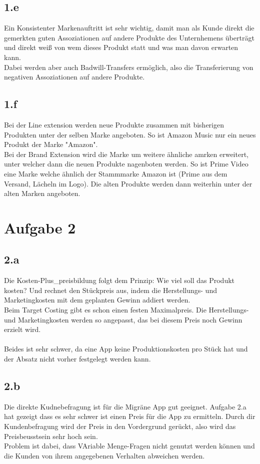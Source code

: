 \subsection{1.e}
    Ein Konsistenter Markenauftritt ist sehr wichtig, damit man als Kunde direkt die gemerkten guten Assoziationen auf andere Produkte des Unternhemens überträgt und direkt weiß von wem dieses Produkt statt und was man davon erwarten kann. \\
    Dabei werden aber auch Badwill-Transfers ermöglich, also die Transferierung von negativen Assoziationen auf andere Produkte.

\subsection{1.f}
    Bei der Line extension werden neue Produkte zusammen mit bisherigen Produkten unter der selben Marke angeboten. So ist Amazon Music nur ein neues Produkt der Marke "Amazon".\\
    Bei der Brand Extension wird die Marke um weitere ähnliche amrken erweitert, unter welcher dann die neuen Produkte nagenboten werden. So ist Prime Video eine Marke welche ähnlich der Stammmarke Amazon ist (Prime aus dem Versand, Lächeln im Logo).
    Die alten Produkte werden dann weiterhin unter der alten Marken angeboten.


\section{Aufgabe 2}
\subsection{2.a}
    Die Kosten-Plus_preisbildung folgt dem Prinzip: Wie viel soll das Produkt kosten? Und rechnet den Stückpreis aus, indem die Herstellungs- und Marketingkosten mit dem geplanten Gewinn addiert werden. \\
    Beim Target Costing gibt es schon einen festen Maximalpreis. Die Herstellungs- und Marketingkosten werden so angepasst, das bei diesem Preis noch Gewinn erzielt wird. \\
    \ \\
    Beides ist sehr schwer, da eine App keine Produktionskosten pro Stück hat und der Absatz nicht vorher festgelegt werden kann. \\

\subsection{2.b}
    Die direkte Kudnebefragung ist für die Migräne App gut geeignet. Aufgabe 2.a hat gezeigt dass es sehr schwer ist einen Preis für die App zu ermitteln. Durch dir Kundenbefragung wird der Preis in den Vordergrund gerückt, also wird das Preisbeusstsein sehr hoch sein. \\
    Problem ist dabei, dass VAriable Menge-Fragen nicht genutzt werden können und die Kunden von ihrem angegebenen Verhalten abweichen werden.

